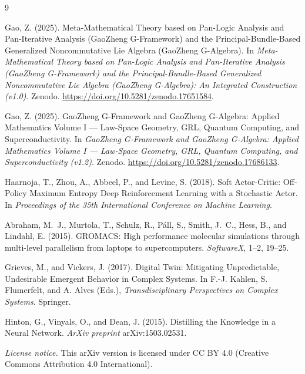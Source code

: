 \documentclass[11pt]{book}
\theoremstyle{plain}
\theoremstyle{definition}
\theoremstyle{remark}
\begin{document}
\begin{thebibliography}{9}

{}

Gao, Z. (2025).
\newblock Meta-Mathematical Theory based on Pan-Logic Analysis and
Pan-Iterative Analysis (GaoZheng G-Framework) and the
Principal-Bundle-Based Generalized Noncommutative Lie Algebra
(GaoZheng G-Algebra).
\newblock In \emph{Meta-Mathematical Theory based on Pan-Logic Analysis and
Pan-Iterative Analysis (GaoZheng G-Framework) and the
Principal-Bundle-Based Generalized Noncommutative Lie Algebra
(GaoZheng G-Algebra): An Integrated Construction (v1.0)}.
\newblock Zenodo.
\newblock \url{https://doi.org/10.5281/zenodo.17651584}.

Gao, Z. (2025).
\newblock GaoZheng G-Framework and GaoZheng G-Algebra: Applied Mathematics Volume I — Law-Space Geometry, GRL, Quantum Computing, and Superconductivity.
\newblock In \emph{GaoZheng G-Framework and GaoZheng G-Algebra: Applied Mathematics Volume I — Law-Space Geometry, GRL, Quantum Computing, and Superconductivity (v1.2)}.
\newblock Zenodo.
\newblock \url{https://doi.org/10.5281/zenodo.17686133}.

Haarnoja, T., Zhou, A., Abbeel, P., and Levine, S. (2018).
\newblock Soft Actor-Critic: Off-Policy Maximum Entropy Deep Reinforcement Learning with a Stochastic Actor.
\newblock In \emph{Proceedings of the 35th International Conference on Machine Learning}.

Abraham, M.~J., Murtola, T., Schulz, R., P\'all, S., Smith, J.~C., Hess, B., and Lindahl, E. (2015).
\newblock GROMACS: High performance molecular simulations through multi-level parallelism from laptops to supercomputers.
\newblock \emph{SoftwareX}, 1--2, 19--25.

Grieves, M., and Vickers, J. (2017).
\newblock Digital Twin: Mitigating Unpredictable, Undesirable Emergent Behavior in Complex Systems.
\newblock In F.-J. Kahlen, S. Flumerfelt, and A. Alves (Eds.),
\emph{Transdisciplinary Perspectives on Complex Systems}.
\newblock Springer.

Hinton, G., Vinyals, O., and Dean, J. (2015).
\newblock Distilling the Knowledge in a Neural Network.
\newblock \emph{ArXiv preprint} arXiv:1503.02531.



\end{thebibliography}

\bigskip
\noindent
\textit{License notice.} This arXiv version is licensed under
CC BY 4.0 (Creative Commons Attribution 4.0 International).
\end{document}

